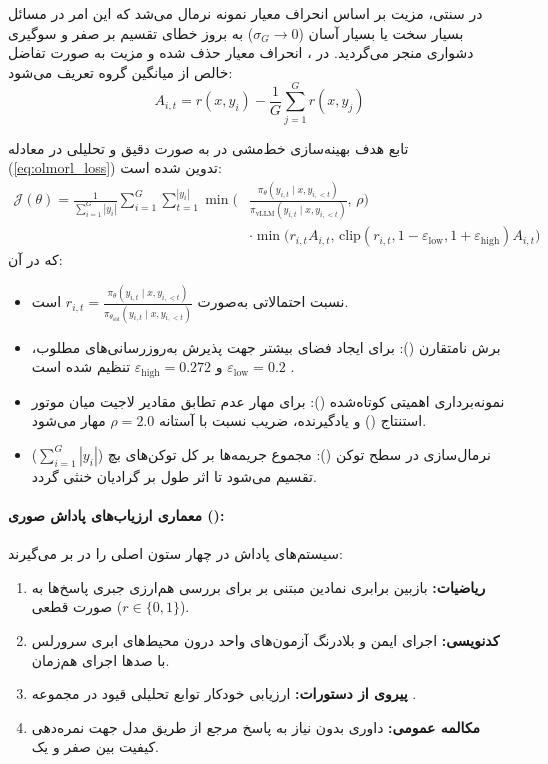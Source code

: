 در  سنتی، مزیت بر اساس انحراف معیار نمونه نرمال می‌شد که این امر در مسائل بسیار سخت یا بسیار آسان ($\sigma_G \to 0$) به بروز خطای تقسیم بر صفر و سوگیری دشواری منجر می‌گردید. در ، انحراف معیار حذف شده و مزیت به صورت تفاضل خالص از میانگین گروه تعریف می‌شود:
\begin{equation}
    A_{i,t} = r(x, y_i) - \frac{1}{G} \sum_{j=1}^G r(x, y_j)
\end{equation}

تابع هدف بهینه‌سازی خط‌مشی در  به صورت دقیق و تحلیلی در معادله (\ref{eq:olmorl_loss}) تدوین شده است:
\begin{equation}
\label{eq:olmorl_loss}
\begin{aligned}
    \mathcal{J}(\theta) = \frac{1}{\sum_{i=1}^G |y_i|} \sum_{i=1}^G \sum_{t=1}^{|y_i|} \min \Bigg( & \frac{\pi_\theta(y_{i,t} \mid x, y_{i,<t})}{\pi_{\text{vLLM}}(y_{i,t} \mid x, y_{i,<t})}, \, \rho \Bigg) \\
    & \cdot \min \Big( r_{i,t} A_{i,t}, \, \text{clip}(r_{i,t}, 1 - \varepsilon_{\text{low}}, 1 + \varepsilon_{\text{high}}) A_{i,t} \Big)
\end{aligned}
\end{equation}
که در آن:
\begin{itemize}
    \item نسبت احتمالاتی به‌صورت $r_{i,t} = \frac{\pi_\theta(y_{i,t} \mid x, y_{i,<t})}{\pi_{\theta_{\text{old}}}(y_{i,t} \mid x, y_{i,<t})}$ است.
    \item برش نامتقارن (): برای ایجاد فضای بیشتر جهت پذیرش به‌روزرسانی‌های مطلوب، $\varepsilon_{\text{low}} = 0.2$ و $\varepsilon_{\text{high}} = 0.272$ تنظیم شده است \cite{yu2025dapo}.
    \item نمونه‌برداری اهمیتی کوتاه‌شده (): برای مهار عدم تطابق مقادیر لاجیت میان موتور استنتاج () و یادگیرنده، ضریب نسبت با آستانه $\rho = 2.0$ مهار می‌شود.
    \item نرمال‌سازی در سطح توکن (): مجموع جریمه‌ها بر کل توکن‌های بچ ($\sum_{i=1}^G |y_i|$) تقسیم می‌شود تا اثر طول بر گرادیان خنثی گردد.
\end{itemize}

\paragraph*{معماری ارزیاب‌های پاداش صوری ():}
سیستم‌های پاداش در  چهار ستون اصلی را در بر می‌گیرند:
\begin{enumerate}
    \item \textbf{ریاضیات:} بازبین برابری نمادین مبتنی بر  برای بررسی هم‌ارزی جبری پاسخ‌ها به صورت قطعی ($r \in \{0, 1\}$).
    \item \textbf{کدنویسی:} اجرای ایمن و بلادرنگ آزمون‌های واحد درون محیط‌های ابری سرورلس  با صدها اجرای هم‌زمان.
    \item \textbf{پیروی از دستورات:} ارزیابی خودکار توابع تحلیلی قیود در مجموعه .
    \item \textbf{مکالمه عمومی:} داوری بدون نیاز به پاسخ مرجع از طریق مدل  جهت نمره‌دهی کیفیت بین صفر و یک.
\end{enumerate}

